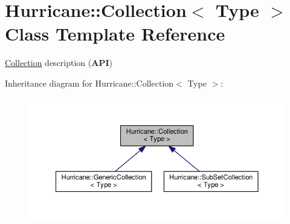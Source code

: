\hypertarget{classHurricane_1_1Collection}{}\section{Hurricane\+:\+:Collection$<$ Type $>$ Class Template Reference}
\label{classHurricane_1_1Collection}


\hyperlink{classHurricane_1_1Collection}{Collection} description ({\bfseries A\+PI})  




Inheritance diagram for Hurricane\+:\+:Collection$<$ Type $>$\+:\nopagebreak
\begin{figure}[H]
\begin{center}
\leavevmode
\includegraphics[width=350pt]{classHurricane_1_1Collection__inherit__graph}
\end{center}
\end{figure}
